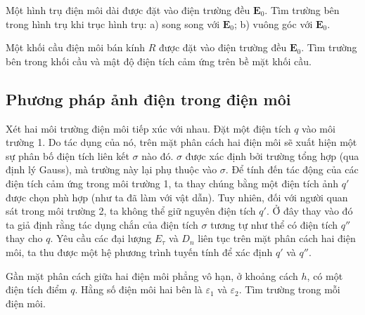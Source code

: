  Một hình trụ điện môi dài được đặt vào điện trường đều $\mathbf{E}_0$. Tìm trường bên trong hình trụ khi trục hình trụ: a) song song với $\mathbf{E}_0$; b) vuông góc với $\mathbf{E}_0$.


 Một khối cầu điện môi bán kính $R$ được đặt vào điện trường đều $\mathbf{E}_0$. Tìm trường bên trong khối cầu và mật độ điện tích cảm ứng trên bề mặt khối cầu.


\subsection{Phương pháp ảnh điện trong điện môi}

Xét hai môi trường điện môi tiếp xúc với nhau. Đặt một điện tích $q$ vào môi trường 1. Do tác dụng của nó, trên mặt phân cách hai điện môi sẽ xuất hiện một sự phân bố điện tích liên kết $\sigma$ nào đó. $\sigma$ được xác định bởi trường tổng hợp (qua định lý Gauss), mà trường này lại phụ thuộc vào $\sigma$. Để tính đến tác động của các điện tích cảm ứng trong môi trường 1, ta thay chúng bằng một điện tích ảnh $q'$ được chọn phù hợp (như ta đã làm với vật dẫn). Tuy nhiên, đối với người quan sát trong môi trường 2, ta không thể giữ nguyên điện tích $q'$. Ở đây thay vào đó ta giả định rằng tác dụng chắn của điện tích $\sigma$ tương tự như thể có điện tích $q''$ thay cho $q$. Yêu cầu các đại lượng $E_\tau$ và $D_n$ liên tục trên mặt phân cách hai điện môi, ta thu được một hệ phương trình tuyến tính để xác định $q'$ và $q''$.

 Gần mặt phân cách giữa hai điện môi phẳng vô hạn, ở khoảng cách $h$, có một điện tích điểm $q$. Hằng số điện môi hai bên là $\varepsilon_1$ và $\varepsilon_2$. Tìm trường trong mỗi điện môi.


